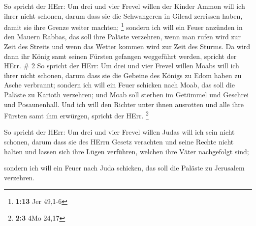  So spricht der HErr: Um drei und vier Frevel willen der
Kinder Ammon will ich ihrer nicht schonen, darum dass sie die
Schwangeren in Gilead zerrissen haben, damit sie ihre Grenze weiter
machten; \footnote{\textbf{1:13} Jer 49,1-6}  sondern ich
will ein Feuer anzünden in den Mauern Rabbas, das soll ihre Paläste
verzehren, wenn man rufen wird zur Zeit des Streits und wenn das Wetter
kommen wird zur Zeit des Sturms.  Da wird dann ihr König
samt seinen Fürsten gefangen weggeführt werden, spricht der HErr. \# 2
 So spricht der HErr: Um drei und vier Frevel willen Moabs
will ich ihrer nicht schonen, darum dass sie die Gebeine des Königs zu
Edom haben zu Asche verbrannt;  sondern ich will ein Feuer
schicken nach Moab, das soll die Paläste zu Karioth verzehren; und Moab
soll sterben im Getümmel und Geschrei und Posaunenhall.  Und
ich will den Richter unter ihnen ausrotten und alle ihre Fürsten samt
ihm erwürgen, spricht der HErr. \footnote{\textbf{2:3} 4Mo 24,17}

 So spricht der HErr: Um drei und vier Frevel willen Judas
will ich sein nicht schonen, darum dass sie des HErrn Gesetz verachten
und seine Rechte nicht halten und lassen sich ihre Lügen verführen,
welchen ihre Väter nachgefolgt sind;

 sondern ich will ein Feuer nach Juda schicken, das soll die
Paläste zu Jerusalem verzehren.

